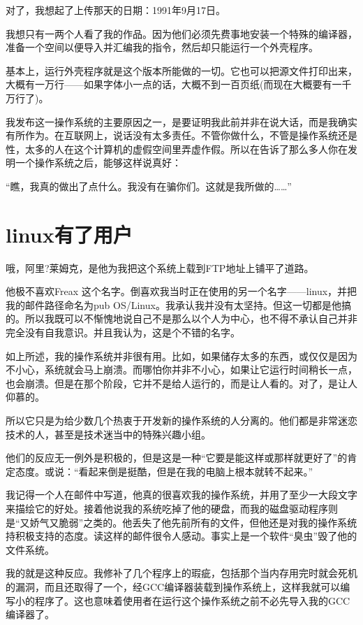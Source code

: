对了，我想起了上传那天的日期：1991年9月17日。

我想只有一两个人看了我的作品。因为他们必须先费事地安装一个特殊的编译器，准备一个空间以便导入并汇编我的指令，然后却只能运行一个外壳程序。

基本上，运行外壳程序就是这个版本所能做的一切。它也可以把源文件打印出来，大概有一万行——如果字体小一点的话，大概不到一百页纸(而现在大概要有一千万行了)。

我发布这一操作系统的主要原因之一，是要证明我此前并非在说大话，而是我确实有所作为。在互联网上，说话没有太多责任。不管你做什么，不管是操作系统还是性，太多的人在这个计算机的虚假空间里弄虚作假。所以在告诉了那么多人你在发明一个操作系统之后，能够这样说真好：

“瞧，我真的做出了点什么。我没有在骗你们。这就是我所做的……”

 
\section{linux有了用户}

哦，阿里?莱姆克，是他为我把这个系统上载到FTP地址上铺平了道路。

他极不喜欢Freax 这个名字。倒喜欢我当时正在使用的另一个名字——linux，并把我的邮件路径命名为pub OS/Linux。我承认我并没有太坚持。但这一切都是他搞的。所以我既可以不惭愧地说自己不是那么以个人为中心，也不得不承认自己并非完全没有自我意识。并且我认为，这是个不错的名字。

如上所述，我的操作系统并非很有用。比如，如果储存太多的东西，或仅仅是因为不小心，系统就会马上崩溃。而哪怕你并非不小心，如果让它运行时间稍长一点，也会崩溃。但是在那个阶段，它并不是给人运行的，而是让人看的。对了，是让人仰慕的。

所以它只是为给少数几个热衷于开发新的操作系统的人分离的。他们都是非常迷恋技术的人，甚至是技术迷当中的特殊兴趣小组。

他们的反应无一例外是积极的，但是这是一种“它要是能这样或那样就更好了”的肯定态度。或说：“看起来倒是挺酷，但是在我的电脑上根本就转不起来。”

我记得一个人在邮件中写道，他真的很喜欢我的操作系统，并用了至少一大段文字来描绘它的好处。接着他说我的系统吃掉了他的硬盘，而我的磁盘驱动程序则是“又娇气又脆弱”之类的。他丢失了他先前所有的文件，但他还是对我的操作系统持积极支持的态度。读这样的邮件很令人感动。事实上是一个软件“臭虫”毁了他的文件系统。

我的就是这种反应。我修补了几个程序上的瑕疵，包括那个当内存用完时就会死机的漏洞，而且还取得了一个，经GCC编译器装载到操作系统上，这样我就可以编写小的程序了。这也意味着使用者在运行这个操作系统之前不必先导入我的GCC编译器了。

